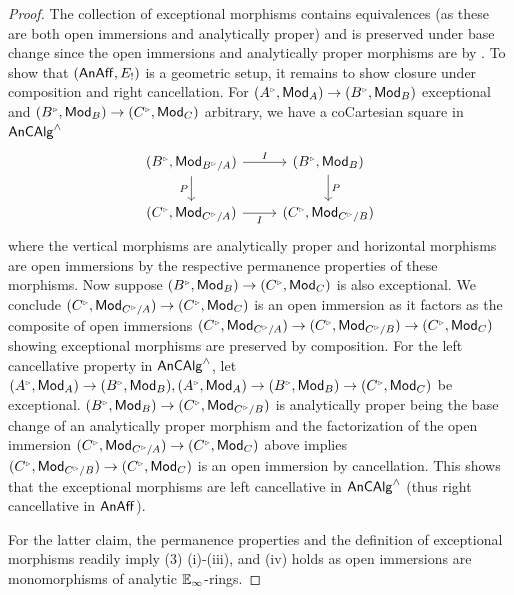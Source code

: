 \begin{proof}
    The collection of exceptional morphisms contains equivalences (as these are both open immersions and analytically proper) and is preserved under base change since the open immersions and analytically proper morphisms are by . To show that $(\mathsf{An}\mathsf{Aff},E_{!})$ is a geometric setup, it remains to show closure under composition and right cancellation. For $(A^{\tri},\Mod_{A})\to(B^{\tri},\Mod_{B})$ exceptional and $(B^{\tri},\Mod_{B})\to(C^{\tri},\Mod_{C})$ arbitrary, we have a coCartesian square in $\mathsf{An}\mathsf{CAlg}^{\wedge}$
    $$%
    \begin{tikzcd}
        {(B^{\tri},\Mod_{B^{\tri}/A})} & {(B^{\tri},\Mod_{B})} \\
        {(C^{\tri},\Mod_{C^{\tri}/A})} & {(C^{\tri},\Mod_{C^{\tri}/B})}
        \arrow["I", from=1-1, to=1-2]
        \arrow["P"', from=1-1, to=2-1]
        \arrow["P", from=1-2, to=2-2]
        \arrow["I"', from=2-1, to=2-2]
    \end{tikzcd}$$
    where the vertical morphisms are analytically proper and horizontal morphisms are open immersions by the respective permanence properties of these morphisms. Now suppose $(B^{\tri},\Mod_{B})\to(C^{\tri},\Mod_{C})$ is also exceptional. We conclude $(C^{\tri},\Mod_{C^{\tri}/A})\to(C^{\tri},\Mod_{C})$ is an open immersion as it factors as the composite of open immersions $(C^{\tri},\Mod_{C^{\tri}/A})\to(C^{\tri},\Mod_{C^{\tri}/B})\to(C^{\tri},\Mod_{C})$ showing exceptional morphisms are preserved by composition. For the left cancellative property in $\mathsf{An}\mathsf{CAlg}^{\wedge}$, let $(A^{\tri},\Mod_{A})\to (B^{\tri},\Mod_{B}),(A^{\tri},\Mod_{A})\to(B^{\tri},\Mod_{B})\to(C^{\tri},\Mod_{C})$ be exceptional. $(B^{\tri},\Mod_{B})\to(C^{\tri},\Mod_{C^{\tri}/B})$ is analytically proper being the base change of an analytically proper morphism and the factorization of the open immersion $(C^{\tri},\Mod_{C^{\tri}/A})\to(C^{\tri},\Mod_{C})$ above implies $(C^{\tri},\Mod_{C^{\tri}/B})\to(C^{\tri},\Mod_{C})$ is an open immersion by cancellation. This shows that the exceptional morphisms are left cancellative in $\mathsf{An}\mathsf{CAlg}^{\wedge}$ (thus right cancellative in $\mathsf{An}\mathsf{Aff}$). 

    For the latter claim, the permanence properties  and the definition of exceptional morphisms  readily imply  (3) (i)-(iii), and (iv) holds as open immersions are monomorphisms of analytic $\mathbb{E}_{\infty}$-rings. 
\end{proof}
